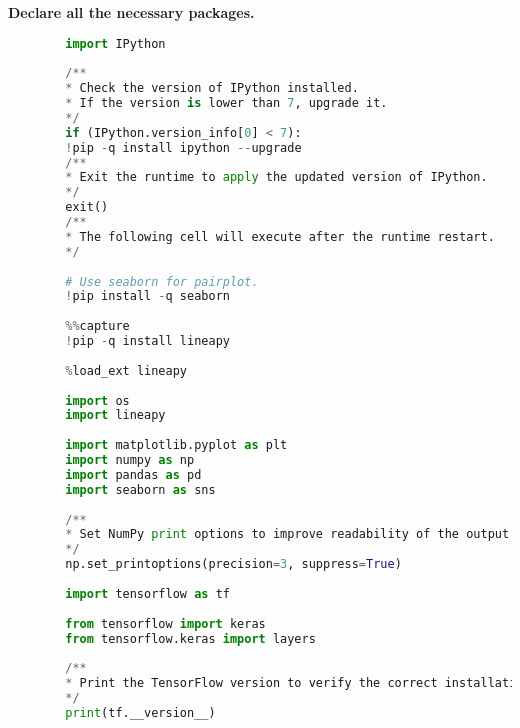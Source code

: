 	\pagebreak
	
	\textbf{Declare all the necessary packages.}
	\begin{lstlisting}[language=Python]
		%%capture
		import IPython
		
		/**
		* Check the version of IPython installed.
		* If the version is lower than 7, upgrade it.
		*/
		if (IPython.version_info[0] < 7):
		!pip -q install ipython --upgrade
		/**
		* Exit the runtime to apply the updated version of IPython.
		*/
		exit()
		/**
		* The following cell will execute after the runtime restart.
		*/
		
		# Use seaborn for pairplot.
		!pip install -q seaborn
		
		%%capture
		!pip -q install lineapy
		
		%load_ext lineapy
		
		import os
		import lineapy
		
		import matplotlib.pyplot as plt
		import numpy as np
		import pandas as pd
		import seaborn as sns
		
		/**
		* Set NumPy print options to improve readability of the output.
		*/
		np.set_printoptions(precision=3, suppress=True)
		
		import tensorflow as tf
		
		from tensorflow import keras
		from tensorflow.keras import layers
		
		/**
		* Print the TensorFlow version to verify the correct installation.
		*/
		print(tf.__version__)
	\end{lstlisting}
	
